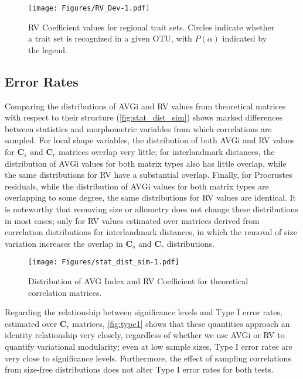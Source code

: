 \documentclass[12pt,]{article}
\begin{document}
\begin{figure}[htbp]
\centering
\texttt{[image: Figures/RV\_Dev-1.pdf]}
\caption{RV Coefficient values for regional trait sets. Circles indicate
whether a trait set is recognized in a given OTU, with $P(\alpha)$
indicated by the legend. \label{fig:RV_Dev}}
\end{figure}

\subsection{Error Rates}\label{error-rates}

Comparing the distributions of AVGi and RV values from theoretical
matrices with respect to their structure (\autoref{fig:stat_dist_sim})
shows marked differences between statistics and morphometric variables
from which correlations are sampled. For local shape variables, the
distribution of both AVGi and RV values for $\mathbf{C}_s$ and
$\mathbf{C}_r$ matrices overlap very little; for interlandmark
distances, the distribution of AVGi values for both matrix types also
has little overlap, while the same distributions for RV have a
substantial overlap. Finally, for Procrustes residuals, while the
distribution of AVGi values for both matrix types are overlapping to
some degree, the same distributions for RV values are identical. It is
noteworthy that removing size or allometry does not change these
distributions in most cases; only for RV values estimated over matrices
derived from correlation distributions for interlandmark distances, in
which the removal of size variation increases the overlap in
$\mathbf{C}_s$ and $\mathbf{C}_r$ distributions.

\begin{figure}[htbp]
\centering
\texttt{[image: Figures/stat\_dist\_sim-1.pdf]}
\caption{Distribution of AVG Index and RV Coefficient for theoretical
correlation matrices. \label{fig:stat_dist_sim}}
\end{figure}

Regarding the relationship between significance levels and Type I error
rates, estimated over $\mathbf{C}_r$ matrices, \autoref{fig:type1} shows
that these quantities approach an identity relationship very closely,
regardless of whether we use AVGi or RV to quantify variational
modularity; even at low sample sizes, Type I error rates are very close
to significance levels. Furthermore, the effect of sampling correlations
from size-free distributions does not alter Type I error rates for both
tests.
\end{document}
